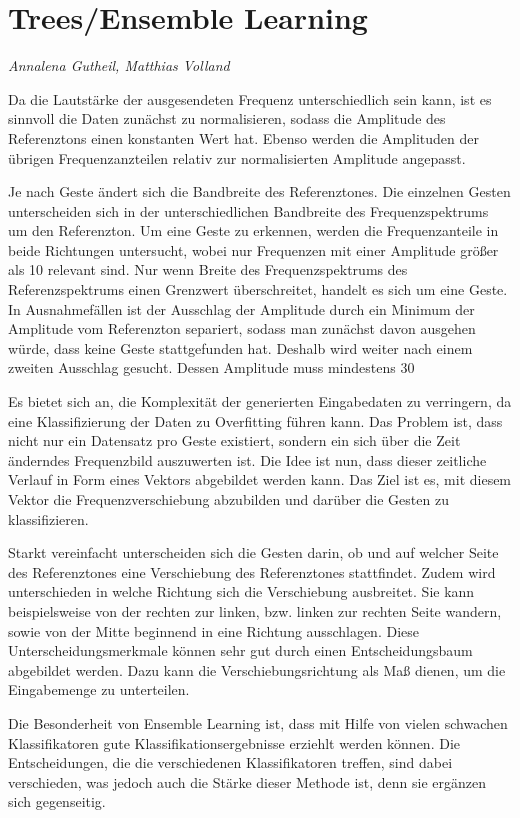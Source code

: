 \section{Trees/Ensemble Learning}
\textit{Annalena Gutheil, Matthias Volland}

Da die Lautstärke der ausgesendeten Frequenz unterschiedlich sein kann, ist es sinnvoll die Daten 
zunächst zu normalisieren, sodass die Amplitude des Referenztons einen konstanten Wert hat. Ebenso 
werden die Amplituden der übrigen Frequenzanzteilen relativ zur normalisierten Amplitude angepasst.

Je nach Geste ändert sich die Bandbreite des Referenztones.
Die einzelnen Gesten unterscheiden sich in der unterschiedlichen Bandbreite des Frequenzspektrums 
um den Referenzton. Um eine Geste zu erkennen, werden die Frequenzanteile in beide Richtungen 
untersucht, wobei nur Frequenzen mit einer Amplitude größer als 10%
relevant sind. Nur wenn Breite des Frequenzspektrums des Referenzspektrums einen Grenzwert 
überschreitet, handelt es sich um eine Geste. In Ausnahmefällen ist der Ausschlag der Amplitude 
durch ein Minimum der Amplitude vom Referenzton separiert, sodass man zunächst davon ausgehen würde, 
dass keine Geste stattgefunden hat. Deshalb wird weiter nach einem zweiten Ausschlag gesucht. Dessen 
Amplitude muss mindestens 30%

Es bietet sich an, die Komplexität der generierten Eingabedaten zu verringern, da eine Klassifizierung 
der Daten zu Overfitting führen kann. 
Das Problem ist, dass nicht nur ein Datensatz pro Geste existiert, sondern ein sich über die Zeit änderndes 
Frequenzbild auszuwerten ist. 
Die Idee ist nun, dass dieser zeitliche Verlauf in Form eines Vektors abgebildet werden kann. Das Ziel ist es,
mit diesem Vektor die Frequenzverschiebung abzubilden und darüber die Gesten zu klassifizieren. 

Starkt vereinfacht unterscheiden sich die Gesten darin, ob und auf welcher Seite des Referenztones eine 
Verschiebung des Referenztones stattfindet. 
Zudem wird unterschieden in welche Richtung sich die Verschiebung ausbreitet. Sie kann beispielsweise von 
der rechten zur linken, bzw. linken zur rechten Seite wandern, sowie von der Mitte beginnend in eine 
Richtung ausschlagen.
Diese Unterscheidungsmerkmale können sehr gut durch einen Entscheidungsbaum abgebildet werden. Dazu kann 
die Verschiebungsrichtung als Maß dienen, um die Eingabemenge zu unterteilen. 

Die Besonderheit von Ensemble Learning ist, dass mit Hilfe von vielen schwachen Klassifikatoren 
gute Klassifikationsergebnisse erziehlt werden können. Die Entscheidungen, die die verschiedenen 
Klassifikatoren treffen, sind dabei verschieden, was jedoch auch die Stärke dieser Methode ist, 
denn sie ergänzen sich gegenseitig. 

